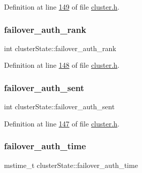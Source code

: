 Definition at line \hyperlink{cluster_8h_source_l00149}{149} of file \hyperlink{cluster_8h_source}{cluster.\+h}.

\mbox{\label{structclusterState_a04b0fcfbf51ba160dfaa92e3009b8cb1}} 
\subsubsection{\texorpdfstring{failover\+\_\+auth\+\_\+rank}{failover\_auth\_rank}}
{\footnotesize\ttfamily int cluster\+State\+::failover\+\_\+auth\+\_\+rank}



Definition at line \hyperlink{cluster_8h_source_l00148}{148} of file \hyperlink{cluster_8h_source}{cluster.\+h}.

\mbox{\label{structclusterState_a3b6d9abb6c5bd0cd96ebf8478d9dacdd}} 
\subsubsection{\texorpdfstring{failover\+\_\+auth\+\_\+sent}{failover\_auth\_sent}}
{\footnotesize\ttfamily int cluster\+State\+::failover\+\_\+auth\+\_\+sent}



Definition at line \hyperlink{cluster_8h_source_l00147}{147} of file \hyperlink{cluster_8h_source}{cluster.\+h}.

\mbox{\label{structclusterState_ae4ecf61e881a8d51e08b0737c3ced2dc}} 
\subsubsection{\texorpdfstring{failover\+\_\+auth\+\_\+time}{failover\_auth\_time}}
{\footnotesize\ttfamily mstime\+\_\+t cluster\+State\+::failover\+\_\+auth\+\_\+time}



